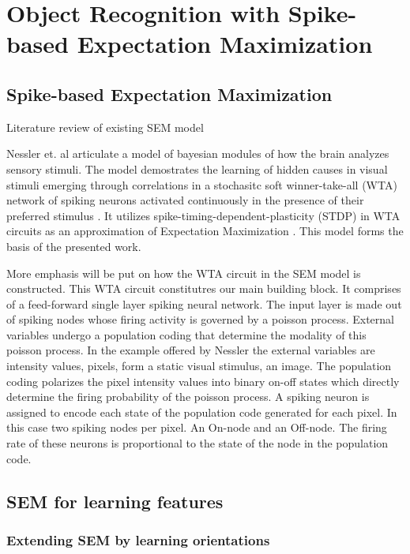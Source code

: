 \documentclass{report}
\begin{document}
\chapter{Object Recognition with Spike-based Expectation Maximization}

\section{Spike-based Expectation Maximization}

Literature review of existing SEM model

Nessler et. al articulate a model of bayesian modules of how the brain analyzes sensory stimuli. The model demostrates the learning of hidden causes in visual stimuli emerging through correlations in a stochasitc soft winner-take-all (WTA) network of spiking neurons activated continuously in the presence of their preferred stimulus \cite{Nessler2010}. It utilizes spike-timing-dependent-plasticity (STDP) in WTA circuits as an approximation of Expectation Maximization \cite{Nessler2013}. This model forms the basis of the presented work.

More emphasis will be put on how the WTA circuit in the SEM model is constructed. This WTA circuit constitutres our main building block. It comprises of a feed-forward single layer spiking neural network. The input layer is made out of spiking nodes whose firing activity is governed  by a poisson process. External variables undergo a population coding that determine the modality of this poisson process. In the example offered by Nessler the external variables are intensity values, pixels, form a static visual stimulus, an image. The population coding polarizes the pixel intensity values into binary on-off states which directly determine the firing probability of the poisson process. A spiking neuron is assigned to encode each state of the population code generated for each pixel. In this case two spiking nodes per pixel. An On-node and an Off-node. The firing rate of these neurons is proportional to the state of the node in the population code.

\section{SEM for learning features}

\subsection{Extending SEM by learning orientations}
\end{document}
